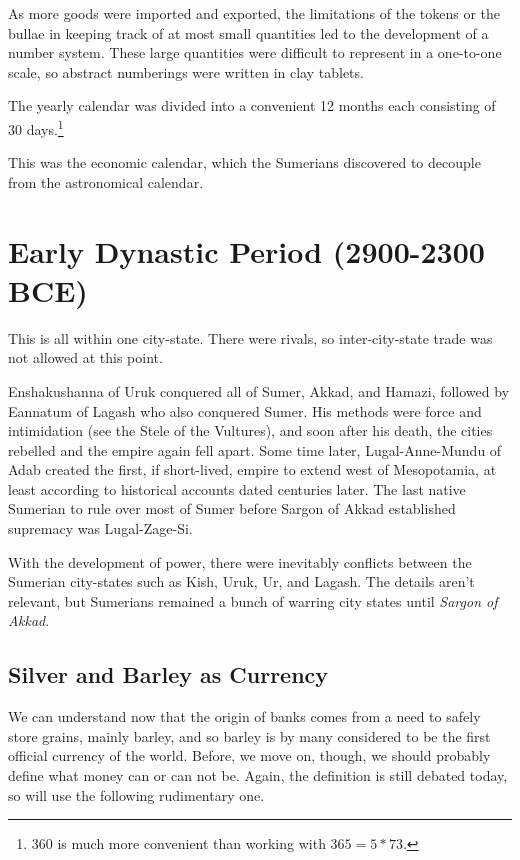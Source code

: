 \documentclass{article}
\begin{document}
    \begin{technology}
      As more goods were imported and exported, the limitations of the tokens or the bullae in keeping track of at most small quantities led to the development of a number system. These large quantities were difficult to represent in a one-to-one scale, so abstract numberings were written in clay tablets. 
    \end{technology}

    \begin{technology}
      The yearly calendar was divided into a convenient 12 months each consisting of 30 days.\footnote{360 is much more convenient than working with $365 = 5 * 73$. } 
    \end{technology}

    This was the economic calendar, which the Sumerians discovered to decouple from the astronomical calendar. 

\section{Early Dynastic Period (2900-2300 BCE)}

  This is all within one city-state. There were rivals, so inter-city-state trade was not allowed at this point. 

  Enshakushanna of Uruk conquered all of Sumer, Akkad, and Hamazi, followed by Eannatum of Lagash who also conquered Sumer. His methods were force and intimidation (see the Stele of the Vultures), and soon after his death, the cities rebelled and the empire again fell apart. Some time later, Lugal-Anne-Mundu of Adab created the first, if short-lived, empire to extend west of Mesopotamia, at least according to historical accounts dated centuries later. The last native Sumerian to rule over most of Sumer before Sargon of Akkad established supremacy was Lugal-Zage-Si. 

  With the development of power, there were inevitably conflicts between the Sumerian city-states such as Kish, Uruk, Ur, and Lagash. The details aren't relevant, but Sumerians remained a bunch of warring city states until \textit{Sargon of Akkad}. 

  \subsection{Silver and Barley as Currency}

    We can understand now that the origin of banks comes from a need to safely store grains, mainly barley, and so barley is by many considered to be the first official currency of the world. Before, we move on, though, we should probably define what money can or can not be. Again, the definition is still debated today, so will use the following rudimentary one.
\end{document}
